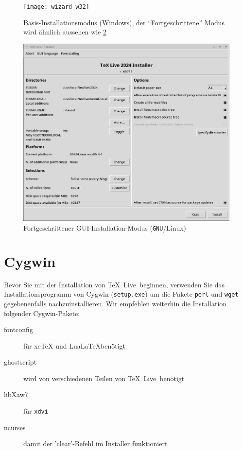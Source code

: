 \documentclass[12pt,ngerman,a4paper,fullparskip]{scrreprt}
\newcommand{\TL}{\TeX\ Live\xspace}
\newcommand{\acro}[1]{\texttt{#1}}
\newcommand{\code}[1]{\texttt{#1}}
\newcommand{\filename}[1]{\texttt{#1}}
\providecommand*{\GNU}{\acro{GNU}\xspace}
\providecommand*{\XeTeX}{xe\TeX\xspace}
\begin{document}
\begin{figure}[tb]
\texttt{[image: wizard-w32]}
\caption{Basis-Installationsmodus (Windows), der \enquote{Fortgeschrittene} Modus wird ähnlich aussehen wie 
\ref{fig:advanced-lnx}}\label{fig:wizard-w32}
\end{figure}


\begin{figure}[tb]
\includegraphics[width={\linewidth}]{advanced-lnx}
\caption{Fortgeschrittener GUI-Installation-Modus (\GNU/Linux)}\label{fig:advanced-lnx}
\end{figure}

\section{Cygwin}\label{sec:cygwin}

Bevor Sie mit der Installation von \TL\ beginnen, verwenden Sie das
Installationsprogramm von Cygwin (\filename{setup.exe}) um die Pakete
\filename{perl} und \filename{wget} gegebenenfalls nachzuinstallieren.
Wir empfehlen weiterhin die Installation folgender Cygwin-Pakete:

\begin{description}
\item[fontconfig] für \XeTeX und Lua\LaTeX benötigt
\item[ghostscript] wird von verschiedenen Teilen von \TL\ benötigt
\item[libXaw7] für \code{xdvi}
\item[ncurses] damit der 'clear'-Befehl im Installer funktioniert
\end{description}
\end{document}
